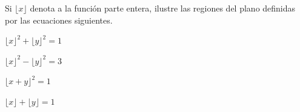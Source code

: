 \item Si $\lfloor x \rfloor$ denota a la función parte entera, ilustre las regiones del plano definidas por las ecuaciones siguientes.
\begin{enumerate}
    \begin{minipage}{0.22\textwidth}
    \item[(a)] $\lfloor x \rfloor^2 + \lfloor y \rfloor^2 = 1$
    \end{minipage}
    \begin{minipage}{0.22\textwidth}
    \item[(b)] $\lfloor x \rfloor^2 - \lfloor y \rfloor^2 = 3$
    \end{minipage}
    \begin{minipage}{0.22\textwidth}
    \item[(c)] $\lfloor x + y \rfloor^2 = 1$
    \end{minipage}
    \begin{minipage}{0.25\textwidth}
    \item[(d)] $\lfloor x \rfloor + \lfloor y \rfloor = 1$
    \end{minipage}
\end{enumerate}
